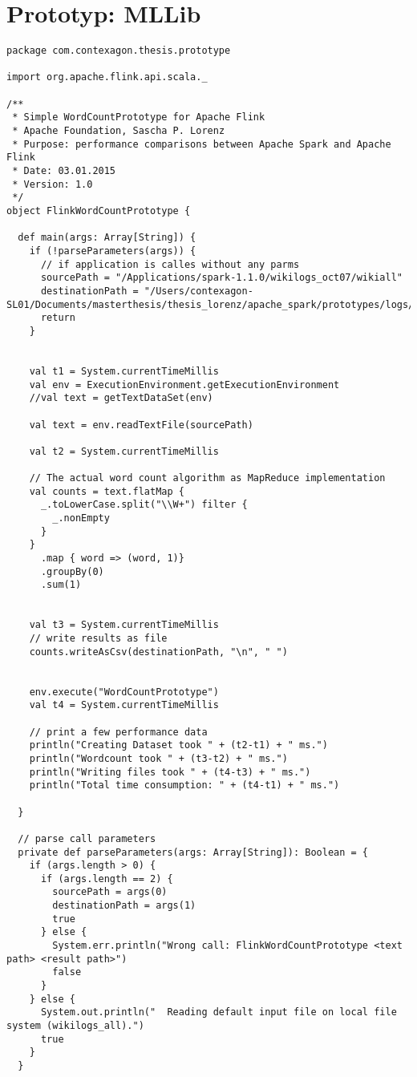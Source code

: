 \section{Prototyp: MLLib }
\label{section:prototyp mllib}


\begin{lstlisting}[label=flink config,caption=WordCountPrototyp für Apache Flink als MapReduce-Implementierung]
package com.contexagon.thesis.prototype

import org.apache.flink.api.scala._

/**
 * Simple WordCountPrototype for Apache Flink
 * Apache Foundation, Sascha P. Lorenz
 * Purpose: performance comparisons between Apache Spark and Apache Flink
 * Date: 03.01.2015
 * Version: 1.0
 */
object FlinkWordCountPrototype {

  def main(args: Array[String]) {
    if (!parseParameters(args)) {
      // if application is calles without any parms
      sourcePath = "/Applications/spark-1.1.0/wikilogs_oct07/wikiall"
      destinationPath = "/Users/contexagon-SL01/Documents/masterthesis/thesis_lorenz/apache_spark/prototypes/logs/flinkOutput.out"
      return
    }


    val t1 = System.currentTimeMillis
    val env = ExecutionEnvironment.getExecutionEnvironment
    //val text = getTextDataSet(env)

    val text = env.readTextFile(sourcePath)

    val t2 = System.currentTimeMillis

    // The actual word count algorithm as MapReduce implementation
    val counts = text.flatMap {
      _.toLowerCase.split("\\W+") filter {
        _.nonEmpty
      }
    }
      .map { word => (word, 1)}
      .groupBy(0)
      .sum(1)


    val t3 = System.currentTimeMillis
    // write results as file
    counts.writeAsCsv(destinationPath, "\n", " ")


    env.execute("WordCountPrototype")
    val t4 = System.currentTimeMillis

    // print a few performance data
    println("Creating Dataset took " + (t2-t1) + " ms.")
    println("Wordcount took " + (t3-t2) + " ms.")
    println("Writing files took " + (t4-t3) + " ms.")
    println("Total time consumption: " + (t4-t1) + " ms.")

  }

  // parse call parameters
  private def parseParameters(args: Array[String]): Boolean = {
    if (args.length > 0) {
      if (args.length == 2) {
        sourcePath = args(0)
        destinationPath = args(1)
        true
      } else {
        System.err.println("Wrong call: FlinkWordCountPrototype <text path> <result path>")
        false
      }
    } else {
      System.out.println("  Reading default input file on local file system (wikilogs_all).")
      true
    }
  }



\end{lstlisting}
